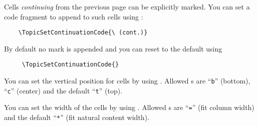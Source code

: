 \documentclass[full,kernel]{l3doc}
\begin{document}
\begin{documentation}
\begin{function}{\TopicSetContinuationCode}
  \begin{syntax}
  \end{syntax}
  Cells \emph{continuing} from the previous page can be explicitly
  marked.  You can set a code fragment to append to such cells using
  :
  \begin{verbatim}
    \TopicSetContinuationCode{\ (cont.)}
  \end{verbatim}
  By default no mark is appended and you can reset to the default
  using
  \begin{verbatim}
     \TopicSetContinuationCode{}
  \end{verbatim}
\end{function}\smallskip

\begin{function}{\TopicSetVPos}
  \begin{syntax}
  \end{syntax}
  You can set the vertical position for  cells by using
  .  Allowed s
  are \enquote{\texttt{b}} (bottom), \enquote{\texttt{c}} (center)
  and the default \enquote{\texttt{t}} (top).
\end{function}\smallskip

\begin{function}{\TopicSetWidth}
  \begin{syntax}
  \end{syntax}
  You can set the width of the  cells by using
  .  Allowed s are
  \enquote{\texttt{=}} (fit column width) and the default
  \enquote{\texttt{*}} (fit natural content width).
\end{function}\smallskip

\end{documentation}

\PrintIndex
\end{document}
